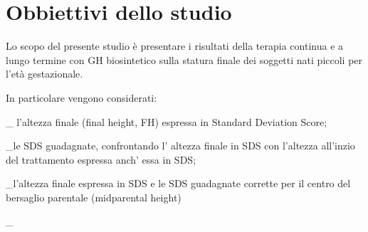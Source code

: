  





\section{Obbiettivi dello studio}


Lo scopo del presente studio è presentare i risultati della terapia continua e a lungo termine  con GH biosintetico sulla statura finale dei soggetti nati piccoli per l'età gestazionale.


In particolare vengono considerati:


_ l'altezza finale (final height, FH) espressa in Standard Deviation Score;


_le SDS guadagnate, confrontando l' altezza finale in SDS con l'altezza all'inzio del trattamento espressa anch' essa in SDS;



_l'altezza finale espressa in SDS e le SDS guadagnate corrette per il centro del bersaglio parentale (midparental height)


 


_

